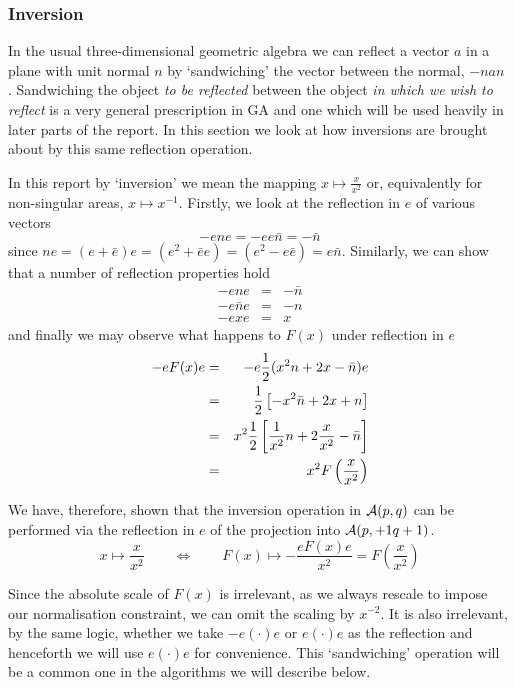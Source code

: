 \subsubsection{Inversion}

In the usual three-dimensional geometric algebra we can reflect a vector $a$
in a plane with unit normal $n$ by `sandwiching' the vector between the
normal, $-nan$ \cite{IJCV98}. Sandwiching the object \emph{to be reflected}
between the object \emph{in which we wish to reflect} is a very general
prescription in GA and one which will be used heavily in later parts of the
report.  In this section we look at how inversions are brought about by this
same reflection operation.

In this report by `inversion' we mean the mapping $x \mapsto \frac{x}{x^2}$ or,
equivalently for non-singular areas, $x \mapsto x^{-1}$. Firstly, we look 
at the reflection in $e$ of various vectors
%
\[ -ene  = -ee\bar{n} = -\bar{n} \] 
since $ne = (e+\bar{e})e=(e^2+\bar{e}e)= (e^2 - e\bar{e}) = e\bar{n}$. 
Similarly, we can show that a number of reflection properties hold
%
\begin{eqnarray} -ene & = &  -\bar{n}  \\ -e\bar{n}e & = &  -{n}  \\ -exe & = &
x \end{eqnarray}
%
and finally we may observe what happens to $F(x)$ under reflection in $e$
%
\begin{eqnarray} -eF(x)e & = &  -e\frac{1}{2}(x^2n + 2x - \bar{n})e  \nonumber \\ & = &
\frac{1}{2}\left[-x^2\bar{n} + 2x + n\right] \nonumber \\ & = &  x^2\frac{1}{2}\left[
\frac{1}{x^2}n + 2\frac{x}{x^2} - \bar{n}\right] \nonumber \\ & = &  x^2
F\left(\frac{x}{x^2}\right) \end{eqnarray}
%

We have, therefore, shown that the inversion operation in ${\mathcal{A}}(p,q)$ can be
performed via the reflection in $e$ of the projection into ${\mathcal{A}}(p,+1q+1)$.
 \begin{equation} x \mapsto \frac{x}{x^2} \qquad \Leftrightarrow \qquad F(x) \mapsto
 -\frac{eF(x)e}{x^2} = F\left(\frac{x}{x^2}\right) \end{equation}
%

Since the absolute scale of $F(x)$ is irrelevant, as we always rescale to
impose our normalisation constraint, we can omit the scaling by $x^{-2}$.  It
is also irrelevant, by the same logic, whether we take $-e(\cdot)e$ or
$e(\cdot)e$ as the reflection and henceforth we will use $e(\cdot)e$ for
convenience. This `sandwiching' operation will be a common one in the algorithms
we will describe below.

